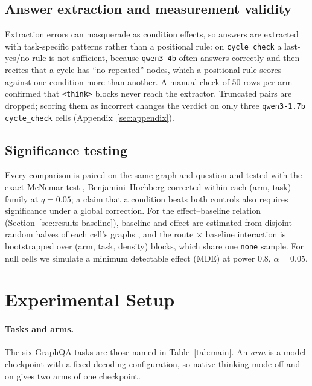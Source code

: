 \documentclass[11pt]{article}
\begin{document}
\subsection{Answer extraction and measurement validity}
\label{sec:extraction}

Extraction errors can masquerade as condition effects, so answers are
extracted with task-specific patterns rather than a positional rule: on
\texttt{cycle\_check} a last-yes/no rule is not sufficient, because
\texttt{qwen3-4b} often answers correctly and then recites that a cycle has
``no repeated'' nodes, which a positional rule scores against one condition
more than another. A manual check of $50$ rows per arm confirmed that
\texttt{<think>} blocks never reach the extractor. Truncated pairs are
dropped; scoring them as incorrect changes the verdict on only three
\texttt{qwen3-1.7b} \texttt{cycle\_check} cells
(Appendix~\ref{sec:appendix}).

\subsection{Significance testing}
\label{sec:significance}

Every comparison is paired on the same graph and question
\citep{dror2018hitchhikers} and tested with the exact McNemar test
\citep{mcnemar1947note}, Benjamini--Hochberg corrected
\citep{benjaminihochberg1995controlling} within each (arm, task)
family at $q{=}0.05$; a claim that a condition beats both controls also
requires significance under a global correction. For the effect--baseline
relation (Section~\ref{sec:results-baseline}), baseline and effect are
estimated from disjoint random halves of each cell's graphs
\citep{chernozhukov2018double}, and the route $\times$ baseline
interaction is bootstrapped over (arm, task, density) blocks, which share
one \texttt{none} sample. For null cells we simulate a
minimum detectable effect (MDE) at power $0.8$, $\alpha{=}0.05$.

\section{Experimental Setup}
\label{sec:setup}

\paragraph{Tasks and arms.} The six GraphQA tasks
\citep{fatemi2023talklikeagraph} are those named in
Table~\ref{tab:main}. An \emph{arm} is a model checkpoint with a fixed
decoding configuration, so native thinking mode off and on gives two arms
of one checkpoint.
\end{document}
